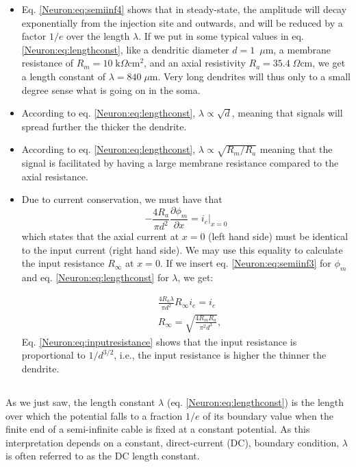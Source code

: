 \begin{itemize}

\item Eq. \ref{Neuron:eq:semiinf4} shows that in steady-state, the amplitude will decay exponentially from the injection site and outwards, and will be reduced by a factor $1/e$ over the length $\lambda$. If we put in some typical values in eq. \ref{Neuron:eq:lengthconst}, like a dendritic diameter $d=1$~$\mu$m, a membrane resistance of $R_m=10\;\text{k}\Omega\text{cm}^2$, and an axial resistivity $R_a=35.4\;\Omega\text{cm}$, we get a length constant of $\lambda = 840\; \mu$m. Very long dendrites will thus only to a small degree sense what is going on in the soma.

\item According to eq. \ref{Neuron:eq:lengthconst}, $\lambda \propto \sqrt{d}$, meaning that signals will spread further the thicker the dendrite.

\item According to eq. \ref{Neuron:eq:lengthconst}, $\lambda \propto \sqrt{R_m/R_a}$ meaning that the signal is facilitated by having a large membrane resistance compared to the axial resistance.

\item Due to current conservation, we must have that
\begin{equation}
- \frac{4R_a}{\pi d^2} \frac{\partial \phi_m}{\partial x}  = i_e  \Big|_{x=0}
\end{equation}
which states that the axial current at $x=0$ (left hand side) must be identical to the input current (right hand side). We may use this equality to calculate the input resistance $R_{\infty}$ at $x=0$. If we insert eq. \ref{Neuron:eq:semiinf3} for $\phi_m$ and eq. \ref{Neuron:eq:lengthconst} for $\lambda$, we get:

\begin{align}
&\frac{4R_a \lambda}{\pi d^2} R_{\infty} i_e  = i_e \\
&R_{\infty} =  \sqrt{\frac{4R_m R_a}{\pi^2 d^3}}, 
\label{Neuron:eq:inputresistance}
\end{align}
Eq. \ref{Neuron:eq:inputresistance} shows that the input resistance is proportional to $1/d^{3/2}$, i.e., the input resistance is higher the thinner the dendrite. 
\end{itemize}



\subsection{}
\label{sec:Neuron:cablefreq}
As we just saw, the length constant $\lambda$ (eq. \ref{Neuron:eq:lengthconst}) is the length over which the potential falls to a fraction $1/e$ of its boundary value when the finite end of a semi-infinite cable is fixed at a constant potential. As this interpretation depends on a constant, direct-current (DC), boundary condition, $\lambda$ is often referred to as the DC length constant. 

